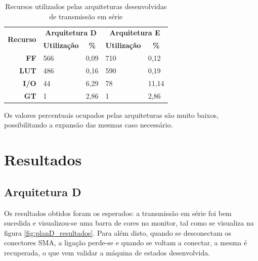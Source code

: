\documentclass[11pt,a4paper]{article}
\begin{document}
\begin{table}[h!]
	\centering
	\caption{Recursos utilizados pelas arquiteturas desenvolvidas de transmissão em série}
	\label{table:recursos_planoD_planoE}
	
	\begin{tabular}{rllll}
		\hline
		\multicolumn{1}{c}{\multirow{2}{*}{\textbf{Recurso}}} & \multicolumn{2}{c}{\textbf{Arquitetura D}}                                 & \multicolumn{2}{c}{\textbf{Arquitetura E}}                               \\ \cline{2-5} 
		\multicolumn{1}{c}{}                                  & \multicolumn{1}{c}{\textbf{Utilização}} & \multicolumn{1}{c|}{\textbf{\%}} & \multicolumn{1}{c}{\textbf{Utilização}} & \multicolumn{1}{c}{\textbf{\%}} \\ \hline
		\multicolumn{1}{r|}{\textbf{FF}}                      & 566                                     & \multicolumn{1}{l|}{0,09}        & 710                                    & 0,12                            \\
		\multicolumn{1}{r|}{\textbf{LUT}}                     & 486                                     & \multicolumn{1}{l|}{0,16}        & 590                                    & 0,19                            \\
		\multicolumn{1}{r|}{\textbf{I/O}}                     & 44                                      & \multicolumn{1}{l|}{6,29}        & 78                                     & 11,14                           \\
		\multicolumn{1}{r|}{\textbf{GT}}                      & 1                                       & \multicolumn{1}{l|}{2,86}        & 1                                      & 2,86                            \\ \hline
	\end{tabular}%
\end{table}
	
	Os valores percentuais ocupados pelas arquiteturas são muito baixos, possibilitando a expansão das mesmas caso necessário. 
	
	
	\section{Resultados}
	\subsection{Arquitetura D}

	Os resultados obtidos foram os esperados: a transmissão em série foi bem sucedida e visualizou-se uma barra de cores no monitor, tal como se visualiza na figura \ref{fig:planD_resultados}. Para além disto, quando se desconectam os conectores SMA, a ligação perde-se e quando se voltam a conectar, a mesma é recuperada, o que vem validar a máquina de estados desenvolvida.
\end{document}
